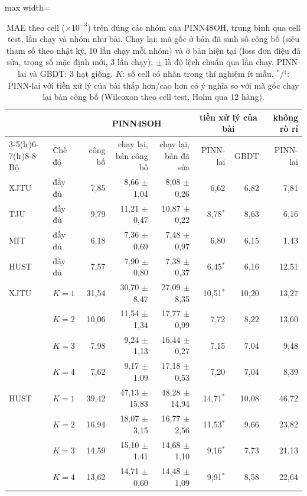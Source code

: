 \begin{table}[!htbp]\centering\small\setlength{\tabcolsep}{4pt}
\caption[So với PINN4SOH trên đúng cách chia của bài]{MAE theo cell ($\times10^{-3}$) trên đúng các nhóm của PINN4SOH, trung bình qua cell test, lần chạy và nhóm như bài. Chạy lại: mã gốc ở bản đã sinh số công bố (siêu tham số theo nhật ký, 10 lần chạy mỗi nhóm) và ở bản hiện tại (loss đơn điệu đã sửa, trọng số mặc định mới, 3 lần chạy); $\pm$ là độ lệch chuẩn qua lần chạy. PINN-lai và GBDT: 3 hạt giống. $K$: số cell có nhãn trong thí nghiệm ít mẫu. $^{*}$/$^{\dagger}$: PINN-lai với tiền xử lý của bài thấp hơn/cao hơn có ý nghĩa so với mã gốc chạy lại bản công bố (Wilcoxon theo cell test, Holm qua 12 hàng).}\label{tab:bench}
\begin{adjustbox}{max width=\textwidth}\begin{tabular}{llrrrrrr}\toprule
 & & \multicolumn{3}{c}{PINN4SOH} & \multicolumn{2}{c}{tiền xử lý của bài} & không rò rỉ \\\cmidrule(lr){3-5}\cmidrule(lr){6-7}\cmidrule(lr){8-8}
Bộ & Chế độ & công bố & chạy lại, bản công bố & chạy lại, bản đã sửa & PINN-lai & GBDT & PINN-lai \\\midrule
XJTU & đầy đủ & 7{,}85 & 8{,}66 $\pm$ 1{,}04 & 8{,}08 $\pm$ 0{,}26 & 6{,}62 & 6{,}82 & 7{,}81 \\
TJU & đầy đủ & 9{,}79 & 11{,}21 $\pm$ 0{,}47 & 10{,}87 $\pm$ 0{,}22 & 8{,}78$^{*}$ & 8{,}63 & 6{,}16 \\
MIT & đầy đủ & 6{,}18 & 7{,}36 $\pm$ 0{,}69 & 7{,}48 $\pm$ 0{,}97 & 6{,}80 & 6{,}15 & 1{,}43 \\
HUST & đầy đủ & 7{,}57 & 7{,}90 $\pm$ 0{,}80 & 7{,}38 $\pm$ 0{,}37 & 6{,}45$^{*}$ & 6{,}16 & 12{,}51 \\
\addlinespace
XJTU & $K = 1$ & 31{,}54 & 30{,}70 $\pm$ 8{,}47 & 27{,}09 $\pm$ 8{,}35 & 10{,}51$^{*}$ & 10{,}20 & 13{,}27 \\
 & $K = 2$ & 10{,}06 & 11{,}54 $\pm$ 1{,}34 & 17{,}77 $\pm$ 0{,}99 & 7{,}72 & 8{,}22 & 13{,}60 \\
 & $K = 3$ & 7{,}98 & 9{,}24 $\pm$ 1{,}13 & 16{,}44 $\pm$ 0{,}27 & 7{,}15 & 7{,}04 & 9{,}48 \\
 & $K = 4$ & 7{,}62 & 9{,}17 $\pm$ 1{,}09 & 17{,}18 $\pm$ 0{,}53 & 7{,}20 & 7{,}04 & 8{,}39 \\
\addlinespace
HUST & $K = 1$ & 39{,}42 & 47{,}13 $\pm$ 15{,}83 & 48{,}28 $\pm$ 14{,}94 & 14{,}71$^{*}$ & 10{,}08 & 46{,}72 \\
 & $K = 2$ & 16{,}94 & 18{,}07 $\pm$ 3{,}15 & 16{,}77 $\pm$ 2{,}56 & 11{,}53$^{*}$ & 9{,}66 & 23{,}82 \\
 & $K = 3$ & 14{,}59 & 15{,}10 $\pm$ 1{,}41 & 14{,}68 $\pm$ 1{,}10 & 9{,}16$^{*}$ & 7{,}73 & 21{,}13 \\
 & $K = 4$ & 13{,}62 & 14{,}71 $\pm$ 0{,}60 & 14{,}48 $\pm$ 1{,}09 & 9{,}91$^{*}$ & 8{,}58 & 22{,}64 \\
\bottomrule\end{tabular}\end{adjustbox}\end{table}

